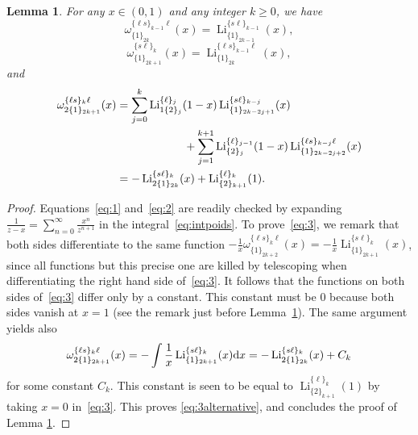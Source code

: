 \documentclass[reqno,12pt]{amsart}
\numberwithin{equation}{section}
\newtheorem{lem}{Lemma}
\theoremstyle{remark}
\def\om{\omega}
\def\li{\operatorname{Li}}
\def\dd{\textup{d}}
\begin{document}
\begin{lem}\label{lem:1} For any $x\in (0,1)$ and any integer $k\ge 0$, we have
\begin{equation}\label{eq:1}
\om_{\{1\}_{2k}}^{\{\ell s\}_{k-1}\ell}(x)=\li_{\{1\}_{2k-1}}^{\{s\ell\}_{k-1}}(x), 
\end{equation}
\begin{equation}\label{eq:2}
\om_{\{1\}_{2k+1}}^{\{s \ell \}_{k}}(x)=\li_{\{1\}_{2k}}^{\{\ell s\}_{k-1}\ell}(x),
\end{equation}
and 
\begin{align}
\om_{2\{1\}_{2k+1}}^{\{\ell s\}_{k}\ell}(x)&=\sum_{j=0}^k \li_{1\{2\}_j}^{\{\ell\}_j}(1-x) \li_{\{1\}_{2k-2j+1}}^{\{s \ell\}_{k-j}}(x) \notag
\\
& \qquad \qquad \qquad +\sum_{j=1}^{k+1} \li_{\{2\}_j}^{\{\ell\}_{j-1}}(1-x) \li_{\{1\}_{2k-2j+2}}^{\{\ell s\}_{k-j}\ell}(x) \label{eq:3}
\\ 
&= -\li_{2\{1\}_{2k}}^{\{s \ell \}_{k}}(x) + \li_{\{2\}_{k+1}}^{\{\ell\}_k}(1).\label{eq:3alternative}
\end{align}



\end{lem}
\begin{proof} Equations~\eqref{eq:1} and~\eqref{eq:2} are readily checked by expanding 
$\frac{1}{z-x}=\sum_{n=0}^{\infty} \frac{x^n}{z^{n+1}}$ in the integral~\eqref{eq:intpoids}.  
To prove~\eqref{eq:3}, we remark that both sides differentiate to the same function 
$
-\frac1x \om_{\{1\}_{2k+2}}^{\{\ell s\}_k\ell}(x)=-\frac1x \li_{\{1\}_{2k+1}}^{\{s \ell \}_{k}}(x)$, since all
  functions but this precise one are 
killed by telescoping when differentiating the right 
hand side of~\eqref{eq:3}. It follows that the functions on both sides 
of~\eqref{eq:3} differ only by a constant. This constant 
must be $0$ because both sides vanish at $x=1$ (see the remark just before Lemma~\ref{lem:1}).
The same argument yields also 
$$
\om_{2\{1\}_{2k+1}}^{\{\ell s\}_{k}\ell}(x) = - \int\frac1x \li_{\{1\}_{2k+1}}^{\{s \ell \}_{k}}(x) \dd x
=-\li_{2\{1\}_{2k}}^{\{s \ell \}_{k}}(x) + C_k
$$
for some constant $C_k$. This constant is seen to be equal to 
$\li_{\{2\}_{k+1}}^{\{\ell\}_k}(1)$ by taking  $x=0$ in~\eqref{eq:3}. This proves \eqref{eq:3alternative}, 
and concludes the proof of Lemma \ref{lem:1}.
\end{proof}
\end{document}
